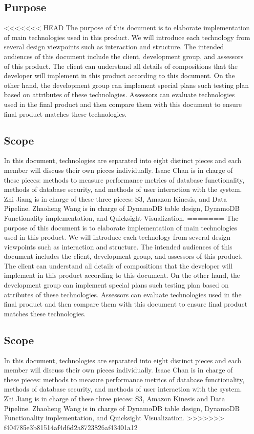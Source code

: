 \subsection{Purpose}
<<<<<<< HEAD
The purpose of this document is to elaborate implementation of main technologies used in this product. We will introduce each technology from several design viewpoints such as interaction and structure. The intended audiences of this document include the client, development group, and assessors of this product. The client can understand all details of compositions that the developer will implement in this product according to this document. On the other hand, the development group can implement special plans such testing plan based on attributes of these technologies. Assessors can evaluate technologies used in the final product and then compare them with this document to ensure final product matches these technologies.  

\subsection{Scope}
In this document, technologies are separated into eight distinct pieces and each member will discuss their own pieces individually. Isaac Chan is in charge of these pieces: methods to measure performance metrics of database functionality, methods of database security, and methods of user interaction with the system. Zhi Jiang is in charge of these three pieces: S3, Amazon Kinesis, and Data Pipeline. Zhaoheng Wang is in charge of DynamoDB table design, DynamoDB Functionality implementation, and Quicksight Visualization.
=======
The purpose of this document is to elaborate implementation of main technologies used in this product. We will introduce each technology from several design viewpoints such as interaction and structure. The intended audiences of this document includes the client, development group, and assessors of this product. The client can understand all details of compositions that the developer will implement in this product according to this document. On the other hand, the development group can implement special plans such testing plan based on attributes of these technologies. Assessors can evaluate technologies used in the final product and then compare them with this document to ensure final product matches these technologies.  

\subsection{Scope}
In this document, technologies are separated into eight distinct pieces and each member will discuss their own pieces individually. Isaac Chan is in charge of these pieces: methods to measure performance metrics of database functionality, methods of database security, and methods of user interaction with the system. Zhi Jiang is in charge of these three pieces: S3, Amazon Kinesis and Data Pipeline. Zhaoheng Wang is in charge of DynamoDB table design, DynamoDB Functionality implementation, and Quicksight Visualization.
>>>>>>> f404785e3b81514af4d6d2a8723826af43401a12

